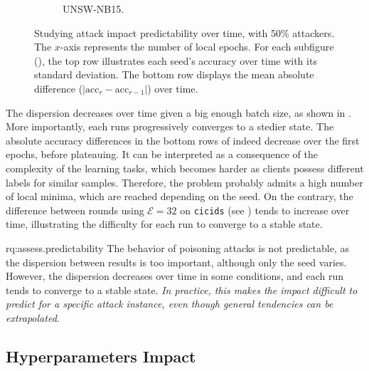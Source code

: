 \begin{figure}
\begin{subfigure}{\linewidth}
    \caption{
      UNSW-NB15.
      \label{fig:predictability.nb15}
    }
  \end{subfigure}
  \caption[
    Studying attack impact predictability over time.
  ]{
    Studying attack impact predictability over time, with 50\% attackers.
    The $x$-axis represents the number of local epochs.
    For each subfigure (), the top row illustrates each seed's accuracy over time with its standard deviation.
    The bottom row displays the mean absolute difference ($|\text{acc}_r - \text{acc}_{r-1}|$) over time.
    \label{fig:assess.predictability}
  }
\end{figure}

The dispersion decreases over time given a big enough batch size, as shown in .
More importantly, each runs progressively converges to a stedier state.
The absolute accuracy differences in the bottom rows of  indeed decrease over the first epochs, before plateauing.
It can be interpreted as a consequence of the complexity of the learning tasks, which becomes harder as clients possess different labels for similar samples.
Therefore, the problem probably admits a high number of local minima, which are reached depending on the seed.
On the contrary, the difference between rounds using $\mathcal{E}=32$ on \texttt{cicids} (see ) tends to increase over time, illustrating the difficulty for each run to converge to a stable state.

\begin{answerbox}{rq:assess.predictability}
  The behavior of poisoning attacks is not predictable, as the dispersion between results is too important, although only the seed varies.
  However, the dispersion decreases over time in some conditions, and each run tends to converge to a stable state.
  \emph{In practice, this makes the impact difficult to predict for a specific attack instance, even though general tendencies can be extrapolated.}
\end{answerbox}



\subsection{Hyperparameters Impact\label{sec:assess.results.hyperparams}}

